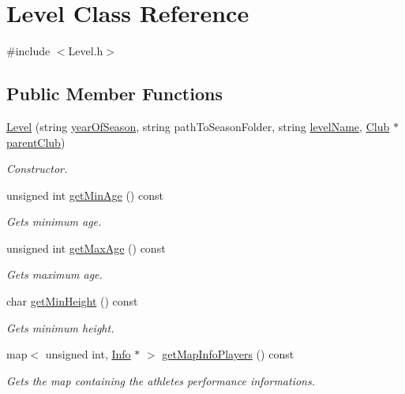 \hypertarget{class_level}{}\section{Level Class Reference}
\label{class_level}


{\ttfamily \#include $<$Level.\+h$>$}

\subsection*{Public Member Functions}
\begin{DoxyCompactItemize}
\item 
\hyperlink{class_level_a3e56499129f883f0cb4e5a855243c1e2}{Level} (string \hyperlink{class_level_a39e8e8b8d5f64c3d3a50b617c3ea8321}{year\+Of\+Season}, string path\+To\+Season\+Folder, string \hyperlink{class_level_aa59964368a47b0d36ff67948b880b3ef}{level\+Name}, \hyperlink{class_club}{Club} $\ast$\hyperlink{class_level_a383670d611a12c518ef48ce9fa179f7a}{parent\+Club})
\begin{DoxyCompactList}\small\item\em Constructor. \end{DoxyCompactList}\item 
unsigned int \hyperlink{class_level_ab773a1c1c9ecfa31c45d5e3e48b38a92}{get\+Min\+Age} () const
\begin{DoxyCompactList}\small\item\em Gets minimum age. \end{DoxyCompactList}\item 
unsigned int \hyperlink{class_level_ae034a3eb28a90653820eb9633b9f7464}{get\+Max\+Age} () const
\begin{DoxyCompactList}\small\item\em Gets maximum age. \end{DoxyCompactList}\item 
char \hyperlink{class_level_a1a32dbbb6c0a3e9cfd26870388a02363}{get\+Min\+Height} () const
\begin{DoxyCompactList}\small\item\em Gets minimum height. \end{DoxyCompactList}\item 
map$<$ unsigned int, \hyperlink{class_info}{Info} $\ast$ $>$ \hyperlink{class_level_a3d4498069e112cbdc952ce1c9e5eb6a5}{get\+Map\+Info\+Players} () const
\begin{DoxyCompactList}\small\item\em Gets the map containing the athletes performance informations. \end{DoxyCompactList}\item 

\end{DoxyCompactItemize}

